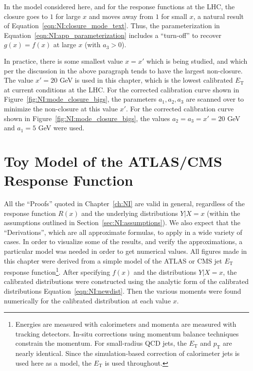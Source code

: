 In the model considered here, and for the response functions at the LHC, the closure goes to $1$ for large $x$ and moves away from $1$ for small $x$, a natural result of Equation~\ref{eqn:NI:closure_mode_text}. Thus, the parameterization in Equation~\ref{eqn:NI:app_parameterization} includes a ``turn-off'' to recover $g(x)=f(x)$ at large $x$ (with $a_3>0$).

In practice, there is some smallest value $x=x'$ which is being studied, and which per the discussion in the above paragraph tends to have the largest non-closure. The value $x'=20$ GeV is used in this chapter, which is the lowest calibrated $E_\text{T}$ at current conditions at the LHC. For the corrected calibration curve shown in Figure~\ref{fig:NI:mode_closure_bigs}, the parameters $a_1,a_2,a_3$ are scanned over to minimize the non-closure at this value $x'$. For the corrected calibration curve shown in Figure~\ref{fig:NI:mode_closure_bigs}, the values $a_2=a_3=x'=20$ GeV and $a_1 = 5$ GeV were used.

\FloatBarrier
\section{Toy Model of the ATLAS/CMS Response Function}
\label{sec:NI:toy_model}
All the ``Proofs'' quoted in Chapter~\ref{ch:NI} are valid in general, regardless of the response function $R(x)$ and the underlying distributions $Y|X=x$ (within the assumptions outlined in Section~\ref{sec:NI:assumptions}). We also expect that the ``Derivations'', which are all approximate formulas, to apply in a wide variety of cases. In order to visualize some of the results, and verify the approximations, a particular model was needed in order to get numerical values. All figures made in this chapter were derived from a simple model of the ATLAS or CMS jet $E_\text{T}$ response function\footnote{Energies are measured with calorimeters and momenta are measured with tracking detectors.  In-situ corrections using momentum balance techniques constrain the momentum.  For small-radius QCD jets, the $E_\text{T}$ and $p_\text{T}$ are nearly identical.  Since the simulation-based correction of calorimeter jets is used here as a model, the $E_\text{T}$ is used throughout. }. After specifying $f(x)$ and the distributions $Y|X=x$, the calibrated distributions were constructed using the analytic form of the calibrated distributions Equation~\ref{eqn:NI:newdist}. Then the various moments were found numerically for the calibrated distribution at each value $x$.

